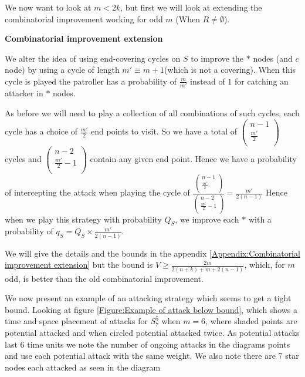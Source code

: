 \documentclass[a4paper,10pt]{article}
\theoremstyle{definition}
\theoremstyle{definition}
\theoremstyle{remark}
\theoremstyle{definition}
\begin{document}
We now want to look at $m < 2k$, but first we will look at extending the combinatorial improvement working for odd $m$ (When $R \neq \emptyset$).

\textbf{Combinatorial improvement extension}

We alter the idea of using end-covering cycles on $S$ to improve the $*$ nodes (and $c$ node) by using a cycle of length $m' \equiv m+1$(which is not a covering). When this cycle is played the patroller has a probability of $\frac{m}{m'}$ instead of $1$ for catching an attacker in $*$ nodes.

As before we will need to play a collection of all combinations of such cycles, each cycle has a choice of $\frac{m'}{2}$ end points to visit. So we have a total of $\left( \begin{array}{c}
n-1 \\
\frac{m'}{2} \\
\end{array} \right)
$ cycles 
and  $\left( \begin{array}{c}
n-2 \\
\frac{m'}{2}-1 \\
\end{array} \right)
$
contain any given end point. Hence we have a probability of intercepting the attack when playing the cycle of $\frac{\left( \begin{array}{c}
n-1 \\
\frac{m'}{2} \\
\end{array} \right)}{\left( \begin{array}{c}
n-2 \\
\frac{m'}{2}-1 \\
\end{array} \right)}=
\frac{m'}{2(n-1)}
$
Hence when we play this strategy with probability $Q_{S}$, we improve each $*$ with a probability of $q_{S}=Q_{S} \times \frac{m'}{2(n-1)}$.

We will give the details and the bounds in the appendix \ref{Appendix:Combinatorial improvement extension} but the bound is $V \geq \frac{2m}{2(n+k)+m+2(n-1)}$, which, for $m$ odd, is better than the old combinatorial improvement.

We now present an example of an attacking strategy which seems to get a tight bound. Looking at figure \ref{Figure:Example of attack below bound}, which shows a time and space placement of attacks for $S_{7}^{5}$ when $m=6$, where shaded points are potential attacked and when circled potential attacked twice. As potential attacks last $6$ time units we note the number of ongoing attacks in the diagrams points and use each potential attack with the same weight. We also note there are $7$ star nodes each attacked as seen in the diagram
\end{document}

